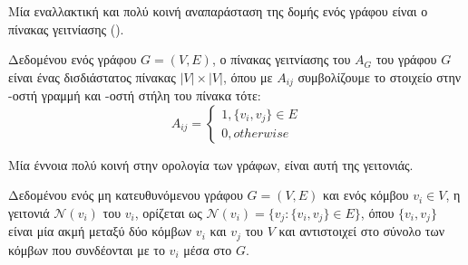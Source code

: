 Μία εναλλακτική και πολύ κοινή αναπαράσταση της δομής ενός γράφου είναι ο πίνακας γειτνίασης ().
\begin{definition}
Δεδομένου ενός γράφου $G = ( V, E )$, ο πίνακας γειτνίασης του $A_{G}$ του γράφου $G$ είναι ένας δισδιάστατος πίνακας $|V|\times |V|$, όπου με $Α_{ij}$ συμβολίζουμε το στοιχείο στην -οστή γραμμή και -οστή στήλη του πίνακα τότε:
$$ A_{ij} =
\begin{cases}
1, \{v_{i}, v_{j}\} \in E\\
0, otherwise
\end{cases}$$
\end{definition}

Μία έννοια πολύ κοινή στην ορολογία των γράφων, είναι αυτή της γειτονιάς.
\begin{definition}[Γειτονιά]
Δεδομένου ενός μη κατευθυνόμενου γράφου $G = ( V, E )$ και ενός κόμβου $v_{i} \in V$,
η γειτονιά $\mathcal{N}(v_{i})$ του $v_{i}$, ορίζεται ως $\mathcal{N}(v_{i}) = \{v_{j} : \{v_{i}, v_{j}\} \in E\}$, όπου $\{v_{i}, v_{j}\}$ είναι μία ακμή μεταξύ δύο κόμβων $v_{i}$ και $v_{j}$ του $V$ και αντιστοιχεί στο σύνολο των κόμβων που συνδέονται με το $v_{i}$ μέσα στο $G$.
\end{definition}

